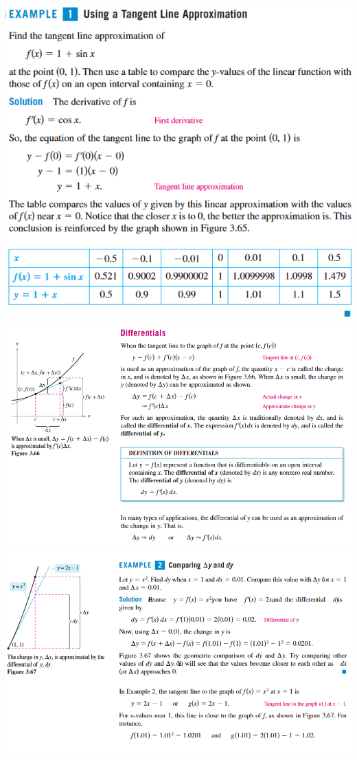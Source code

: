 \documentclass[11pt]{article}
\begin{document}
\includegraphics{ex1.png}\\
\includegraphics[scale=0.75]{diff.png}\\
\includegraphics[scale=0.75]{ex2}
\end{document}
